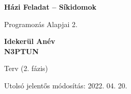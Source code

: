 
\begin{titlepage}
    \begin{center}
        \vspace*{1cm}
            
        \Huge
        \textbf{Házi Feladat – Síkidomok}
            
        \vspace{0.5cm}
        \LARGE
        Programozás Alapjai 2.
            
        \vspace{2.5cm}
            
        \textbf{Idekerül Anév}\\
        \textbf{N3PTUN}
            
        \vfill
            
        Terv (2. fázis)
            
        \vspace{0.8cm}
            
            
        \Large
        Utolsó jelentős módosítás: 2022. 04. 20.
        \vspace*{1cm}
            
    \end{center}
\end{titlepage}
